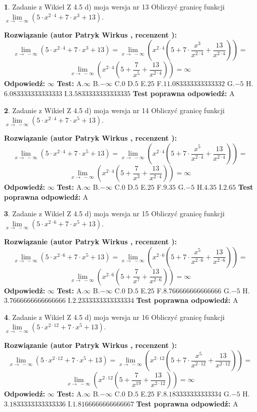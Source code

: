 \documentclass[12pt, a4paper]{article}
\theoremstyle{definition} %
\newtheorem{zad}{}
\newcommand{\zadStart}[1]{\begin{zad}#1\newline}
\newcommand{\zadStop}{\end{zad}}
\newcommand{\rozwStart}[2]{\noindent \textbf{Rozwiązanie (autor #1 , recenzent #2): }\newline}
\newcommand{\rozwStop}{\newline}
\newcommand{\odpStart}{\noindent \textbf{Odpowiedź:}\newline}
\newcommand{\odpStop}{\newline}
\newcommand{\testStart}{\noindent \textbf{Test:}\newline}
\newcommand{\testStop}{\newline}
\newcommand{\kluczStart}{\noindent \textbf{Test poprawna odpowiedź:}\newline}
\newcommand{\kluczStop}{\newline}
\begin{document}
\zadStart{Zadanie z Wikieł Z 4.5 d) moja wersja nr 13}
Obliczyć granicę funkcji  $\lim\limits_{x\to\ -\infty}(5 \cdot x^{2\cdot4}+7 \cdot x^{3}+13)$.
\zadStop
\rozwStart{Patryk Wirkus}{}
$$\lim\limits_{x\to\ -\infty}(5 \cdot x^{2\cdot4}+7 \cdot x^{3}+13) = \lim\limits_{x\to\ -\infty}(x^{2\cdot4}(5 +7 \cdot \frac{x^{3}}{x^{2\cdot4}}+\frac{13}{x^{2\cdot4}})) =$$ $$\lim\limits_{x\to\ -\infty}(x^{2\cdot4}(5 +\frac{7}{x^{5}}+\frac{13}{x^{2\cdot4}})) =\infty$$
\rozwStop
\odpStart
$\infty$
\odpStop
\testStart
A.$\infty$ B.$-\infty$ C.$0$ D.$5$ E.$25$
F.$11.083333333333332$ G.$-5$
H.$6.083333333333333$
I.$3.5833333333333335$
\testStop
\kluczStart
A
\kluczStop



\zadStart{Zadanie z Wikieł Z 4.5 d) moja wersja nr 14}
Obliczyć granicę funkcji  $\lim\limits_{x\to\ -\infty}(5 \cdot x^{2\cdot4}+7 \cdot x^{5}+13)$.
\zadStop
\rozwStart{Patryk Wirkus}{}
$$\lim\limits_{x\to\ -\infty}(5 \cdot x^{2\cdot4}+7 \cdot x^{5}+13) = \lim\limits_{x\to\ -\infty}(x^{2\cdot4}(5 +7 \cdot \frac{x^{5}}{x^{2\cdot4}}+\frac{13}{x^{2\cdot4}})) =$$ $$\lim\limits_{x\to\ -\infty}(x^{2\cdot4}(5 +\frac{7}{x^{3}}+\frac{13}{x^{2\cdot4}})) =\infty$$
\rozwStop
\odpStart
$\infty$
\odpStop
\testStart
A.$\infty$ B.$-\infty$ C.$0$ D.$5$ E.$25$
F.$9.35$ G.$-5$
H.$4.35$
I.$2.65$
\testStop
\kluczStart
A
\kluczStop



\zadStart{Zadanie z Wikieł Z 4.5 d) moja wersja nr 15}
Obliczyć granicę funkcji  $\lim\limits_{x\to\ -\infty}(5 \cdot x^{2\cdot6}+7 \cdot x^{5}+13)$.
\zadStop
\rozwStart{Patryk Wirkus}{}
$$\lim\limits_{x\to\ -\infty}(5 \cdot x^{2\cdot6}+7 \cdot x^{5}+13) = \lim\limits_{x\to\ -\infty}(x^{2\cdot6}(5 +7 \cdot \frac{x^{5}}{x^{2\cdot6}}+\frac{13}{x^{2\cdot6}})) =$$ $$\lim\limits_{x\to\ -\infty}(x^{2\cdot6}(5 +\frac{7}{x^{7}}+\frac{13}{x^{2\cdot6}})) =\infty$$
\rozwStop
\odpStart
$\infty$
\odpStop
\testStart
A.$\infty$ B.$-\infty$ C.$0$ D.$5$ E.$25$
F.$8.766666666666666$ G.$-5$
H.$3.7666666666666666$
I.$2.2333333333333334$
\testStop
\kluczStart
A
\kluczStop



\zadStart{Zadanie z Wikieł Z 4.5 d) moja wersja nr 16}
Obliczyć granicę funkcji  $\lim\limits_{x\to\ -\infty}(5 \cdot x^{2\cdot12}+7 \cdot x^{5}+13)$.
\zadStop
\rozwStart{Patryk Wirkus}{}
$$\lim\limits_{x\to\ -\infty}(5 \cdot x^{2\cdot12}+7 \cdot x^{5}+13) = \lim\limits_{x\to\ -\infty}(x^{2\cdot12}(5 +7 \cdot \frac{x^{5}}{x^{2\cdot12}}+\frac{13}{x^{2\cdot12}})) =$$ $$\lim\limits_{x\to\ -\infty}(x^{2\cdot12}(5 +\frac{7}{x^{19}}+\frac{13}{x^{2\cdot12}})) =\infty$$
\rozwStop
\odpStart
$\infty$
\odpStop
\testStart
A.$\infty$ B.$-\infty$ C.$0$ D.$5$ E.$25$
F.$8.183333333333334$ G.$-5$
H.$3.1833333333333336$
I.$1.8166666666666667$
\testStop
\kluczStart
A
\kluczStop
\end{document}
